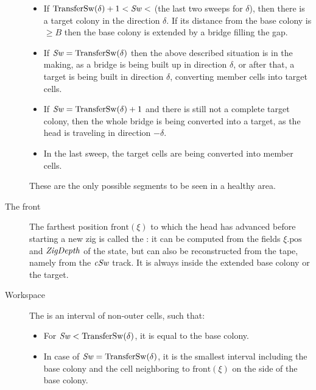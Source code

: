 \documentclass[12pt]{memoir}
\renewcommand{\ge}{\geq}
\newcommand{\fld}[1]{\ensuremath{\textit{#1\/}}}
\def\B{B}
\newcommand{\pos}{\mathrm{pos}}
\newcommand{\Sweep}{\fld{Sw}}
\newcommand{\cSweep}{\fld{cSw}}
\newcommand{\ZigDepth}{\fld{ZigDepth}}
\newcommand{\front}{\mathrm{front}}
\newcommand{\TransferSw}{\mathrm{TransferSw}}
\begin{document}
\begin{definition}
\begin{description}
\begin{itemize}
  \item If \( \TransferSw(\delta) +1 < \Sweep <  \) (the last two sweeps for \( \delta \)),
    then there is a target colony in the direction \( \delta \).
    If its distance from the base colony is \( \ge\B \) then the base
    colony is extended by a bridge filling the gap.
    
  \item If \( \Sweep = \TransferSw(\delta) \) then the above 
    described situation is in the making, as
    a bridge is being built up in direction \( \delta \), or after that,
    a target is being built in direction \( \delta \), converting member cells into target cells.
          
  \item If \( \Sweep = \TransferSw(\delta) +1 \) and there is still not a complete target colony,
    then the whole bridge is being converted into a target, 
    as the head is traveling in direction \( -\delta \).
    
  \item In the last sweep, the target cells are being converted into member cells.
  \end{itemize}
  These are the only possible segments to be seen in a healthy area.
        
    \item [The front] 
      The farthest position \( \front(\xi) \) to which the head has 
      advanced before starting a new zig is called the :
      it can be computed from the fields \( \xi.\pos \) and \( \ZigDepth \) of the state, 
      but can also be reconstructed from the tape, namely from the \( \cSweep \) track.
      It is always inside the extended base colony or the target.

     \item[Workspace]

       \begin{sloppypar}
          The  is an interval of non-outer cells, such that:         
        \end{sloppypar}
        
        \begin{itemize}
        
        \item For \( \Sweep < \TransferSw(\delta) \), it is equal to the base colony.

        \item In case of \( \Sweep = \TransferSw(\delta) \), it is the smallest interval including
              the base colony and the cell neighboring to \( \front(\xi) \) on the side of the base colony.


\end{itemize}
\end{description}
\end{definition}
\end{document}
